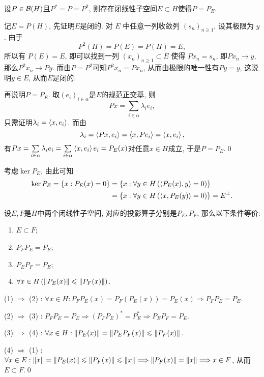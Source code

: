 \begin{Proposition}
	设$ P\in\mathcal{B}(H) $且$ P^*=P=P^2 $, 则存在闭线性子空间$ E\subset H $使得$ P=P_E $.
\end{Proposition}
\begin{Proof}
	记$ E=P(H) $, 先证明$ E $是闭的. 对 $ E $ 中任意一列收敛列 $ (s_{n})_{n\geqslant1} $, 设其极限为 $ y $. 由于
	\[
		P^{2}(H)=P(E)=P(H)=E,
	\]
	所以有 $ P(E)=E $, 即可以找到一列 $ (x_{n})_{n\geqslant1}\subset E $ 使得 $ Px_{n}=s_{n} $, 即$ Px_n\to y $, 那么$ P^2x_n\to Py $. 而由$ P=P^2 $可知$ P^2x_n=Px_n $, 从而由极限的唯一性有$ Py=y $, 这说明$ y\in E $, 从而$ E $是闭的.

	再说明$ P=P_E $. 取$ (e_i)_{i\in\alpha} $是$ E $的规范正交基, 则
	\[
		Px=\sum_{i\in\alpha}\lambda_ie_i,
	\]
	只需证明$ \lambda_i=\left\langle x,e_i \right\rangle $. 而由
	\[
		\lambda_i=\left\langle Px,e_i \right\rangle=\left\langle x,Pe_i \right\rangle=\left\langle x,e_i \right\rangle,
	\]
	有$ Px=\sum\limits_{i\in\alpha}\lambda_ie_i=\sum\limits_{i\in\alpha}\left\langle x,e_i \right\rangle e_i=P_E(x) $对任意$ x\in H $成立, 于是$ P=P_E $.\qed
\end{Proof}
\begin{Remark}
	考虑$ \ker P_E $, 由此可知
	\[
		\begin{aligned}
			\ker P_E=\{ x : P_E(x)=0 \} & =\{ x : \forall y\in H\,(\left\langle P_E(x),y \right\rangle=0) \} \\&=\{ x : \forall y\in H\,(\left\langle x,P_E(y) \right\rangle=0) \}=E^\bot.
		\end{aligned}
	\]
\end{Remark}

\begin{Proposition}
	设$ E, F $是$ H $中两个闭线性子空间, 对应的投影算子分别是$ P_E, P_F $, 那么以下条件等价:
	\begin{enumerate}[(1)]
		\item $ E\subset F $;
		\item $ P_FP_E=P_E $;
		\item $ P_EP_F=P_E $;
		\item $ \forall x\in H\,(\left\| P_E(x) \right\|\leqslant\left\| P_F(x) \right\|) $.
	\end{enumerate}
\end{Proposition}
\begin{Proof}
	(1) $ \Rightarrow $ (2) : $ \forall x\in H : P_FP_E(x)=P_F(P_E(x))=P_E(x)\Longrightarrow P_FP_E=P_E $.

	(2) $ \Rightarrow $ (3) : $ P_FP_E=P_E\Longrightarrow(P_FP_E)^*=P_E^*\Longrightarrow P_EP_F=P_E $.

	(3) $ \Rightarrow $ (4) : $ \forall x\in H : \left\| P_E(x) \right\|=\left\| P_EP_F(x) \right\|\leqslant\left\| P_F(x) \right\| $.

	(4) $ \Rightarrow $ (1) : $ \forall x\in E : \left\| x \right\|=\left\| P_E(x) \right\|\leqslant\left\| P_F(x) \right\|\leqslant\left\| x \right\|\Longrightarrow\left\| P_F(x) \right\|=\left\| x \right\|\Longrightarrow x\in F $, 从而$ E\subset F $.\qed
\end{Proof}

